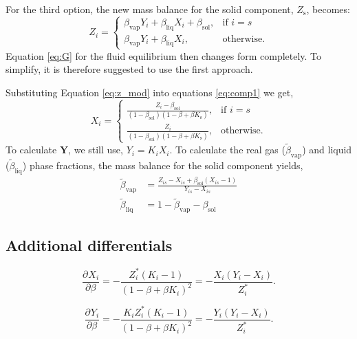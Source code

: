 \documentclass[english]{../thermomemo/thermomemo}
\newcommand*{\pd}[3][]{\frac{\partial^{#1}#2}{\partial{#3}^{#1}}}%
\newcommand*{\vektor}[1]{\boldsymbol{#1}}%
\newcommand{\sol}{\text{sol}}
\newcommand{\liq}{\text{liq}}
\newcommand{\vap}{\text{vap}}
\newcommand{\scomp}{\text{s}\xspace}
\begin{document}
For the third option, the new mass balance for the solid component, $Z_\scomp$, becomes:
\begin{equation}
  Z_i = \begin{cases}
    \beta_\vap Y_i + \beta_\liq X_i + \beta_\sol,& \text{if } i = s\\
    \beta_\vap Y_i + \beta_\liq X_i,            & \text{otherwise}.
\end{cases}
\end{equation}
Equation \ref{eq:G} for the fluid equilibrium then changes form completely. To simplify, it is therefore suggested to use the first approach.

Substituting Equation \ref{eq:z_mod} into equations \ref{eq:comp1} we get,
\begin{equation}
  X_i = \begin{cases}
    \frac{Z_i - \beta_\sol}{\left(1-\beta_\sol\right)\left(1-\beta+\beta K_\scomp\right)},& \text{if } i = s\\
    \frac{Z_i}{\left(1-\beta_\sol\right)\left(1-\beta+\beta K_\scomp\right)},            & \text{otherwise}.
\end{cases}
 \end{equation}
To calculate $\vektor{Y}$, we still use, $Y_i=K_iX_i$.
To calculate the real gas ($\tilde{\beta}_\vap$) and liquid ($\tilde{\beta}_\liq$) phase fractions, the mass balance for the solid component yields,
\begin{align}
  \tilde{\beta}_\vap &= \frac{Z_{is} - X_{is} +
    \beta_\sol \left( X_{is} - 1\right)}{Y_{is}-X_{is}} \\
  \tilde{\beta}_\liq &= 1 - \tilde{\beta}_\vap - \beta_\sol
\end{align}
\subsection{Additional differentials}
\begin{equation}
   \pd{X_i}{\beta} = -\frac{Z_i^*\left(K_i - 1\right)}{\left(1-\beta+\beta K_i\right)^2} = -\frac{X_i\left(Y_i - X_i\right)}{Z_i^*}.
\end{equation}

\begin{equation}
   \pd{Y_i}{\beta} = -\frac{K_i Z_i^* \left(K_i - 1\right)}{\left(1-\beta+\beta K_i\right)^2} = -\frac{Y_i\left(Y_i - X_i\right)}{Z_i^*}.
\end{equation}
\end{document}
